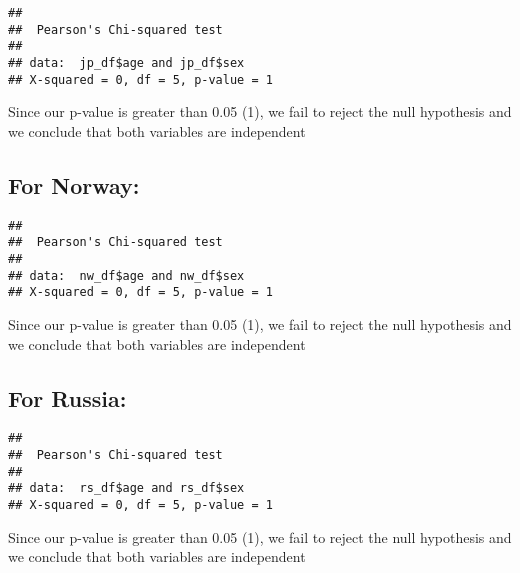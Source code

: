\documentclass[
]{article}
\newenvironment{Shaded}{\begin{snugshade}}{\end{snugshade}}
\newcommand{\FunctionTok}[1]{\textcolor[rgb]{0.00,0.00,0.00}{#1}}
\newcommand{\NormalTok}[1]{#1}
\newcommand{\SpecialCharTok}[1]{\textcolor[rgb]{0.00,0.00,0.00}{#1}}
\begin{document}
\begin{verbatim}
## 
##  Pearson's Chi-squared test
## 
## data:  jp_df$age and jp_df$sex
## X-squared = 0, df = 5, p-value = 1
\end{verbatim}

Since our p-value is greater than 0.05 (1), we fail to reject the null
hypothesis and we conclude that both variables are independent

\hypertarget{for-norway-2}{%
\subsection{For Norway:}\label{for-norway-2}}

\begin{Shaded}
\end{Shaded}

\begin{verbatim}
## 
##  Pearson's Chi-squared test
## 
## data:  nw_df$age and nw_df$sex
## X-squared = 0, df = 5, p-value = 1
\end{verbatim}

Since our p-value is greater than 0.05 (1), we fail to reject the null
hypothesis and we conclude that both variables are independent

\hypertarget{for-russia-1}{%
\subsection{For Russia:}\label{for-russia-1}}

\begin{Shaded}
\end{Shaded}

\begin{verbatim}
## 
##  Pearson's Chi-squared test
## 
## data:  rs_df$age and rs_df$sex
## X-squared = 0, df = 5, p-value = 1
\end{verbatim}

Since our p-value is greater than 0.05 (1), we fail to reject the null
hypothesis and we conclude that both variables are independent
\end{document}
